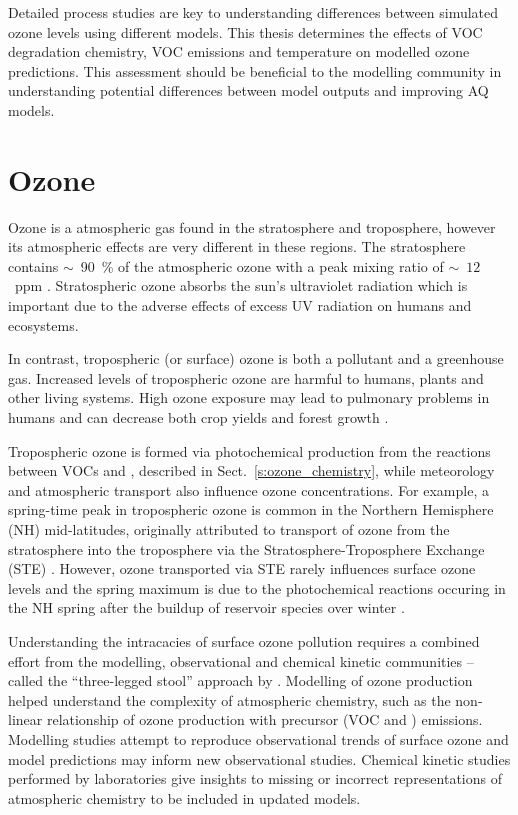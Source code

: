 Detailed process studies are key to understanding differences between simulated ozone levels using different models.
This thesis determines the effects of VOC degradation chemistry, VOC emissions and temperature on modelled ozone predictions.
This assessment should be beneficial to the modelling community in understanding potential differences between model outputs and improving AQ models.

\section{Ozone} \label{s:ozone}
Ozone is a atmospheric gas found in the stratosphere and troposphere, however its atmospheric effects are very different in these regions.
The stratosphere contains $\sim$~90~\% of the atmospheric ozone with a peak mixing ratio of $\sim$~$12$~ppm \citep{Seinfeld:2006}.
Stratospheric ozone absorbs the sun's ultraviolet radiation which is important due to the adverse effects of excess UV radiation on humans and ecosystems.

In contrast, tropospheric (or surface) ozone is both a pollutant and a greenhouse gas. 
Increased levels of tropospheric ozone are harmful to humans, plants and other living systems. 
High ozone exposure may lead to pulmonary problems in humans and can decrease both crop yields and forest growth \citep{WMO:2010}. 

Tropospheric ozone is formed via photochemical production from the reactions between VOCs and , described in Sect.~\ref{s:ozone_chemistry}, while meteorology and atmospheric transport also influence ozone concentrations.
For example, a spring-time peak in tropospheric ozone is common in the Northern Hemisphere (NH) mid-latitudes, originally attributed to transport of ozone from the stratosphere into the troposphere via the Stratosphere-Troposphere Exchange (STE) \citep{Monks:2000}.
However, ozone transported via STE rarely influences surface ozone levels \citep{Lelieveld:2000} and the spring maximum is due to the photochemical reactions occuring in the NH spring after the buildup of reservoir species over winter \citep{Penkett:1986}.

Understanding the intracacies of surface ozone pollution requires a combined effort from the modelling, observational and chemical kinetic communities -- called the ``three-legged stool'' approach by \citet{Abbatt:2014}.
Modelling of ozone production helped understand the complexity of atmospheric chemistry, such as the non-linear relationship of ozone production with precursor (VOC and ) emissions.
Modelling studies attempt to reproduce observational trends of surface ozone and model predictions may inform new observational studies.
Chemical kinetic studies performed by laboratories give insights to missing or incorrect representations of atmospheric chemistry to be included in updated models.

